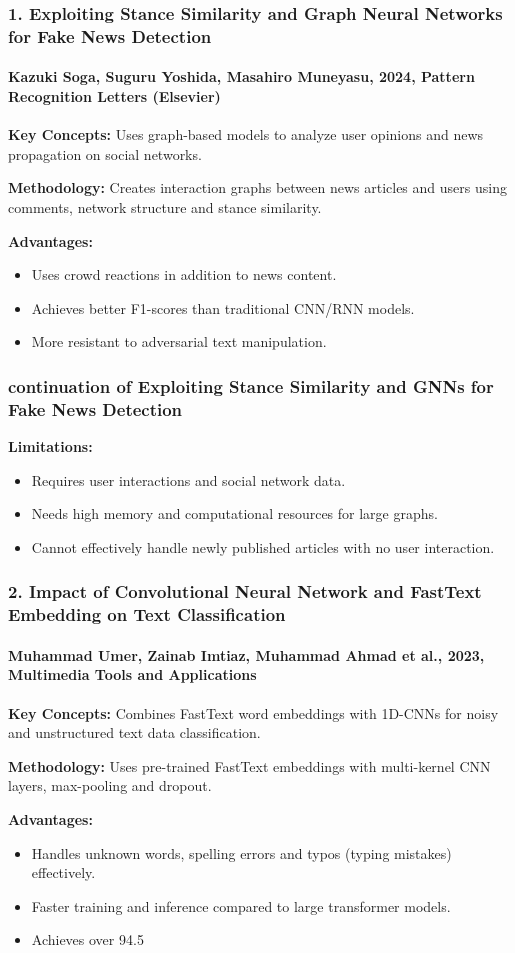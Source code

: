 \documentclass{beamer}
\begin{document}
\begin{frame}
\frametitle{1. Exploiting Stance Similarity and Graph Neural Networks for Fake News Detection}
\framesubtitle{Kazuki Soga, Suguru Yoshida, Masahiro Muneyasu, 2024, Pattern Recognition Letters (Elsevier)}
\small{
\textbf{Key Concepts:} Uses graph-based models to analyze user opinions and news propagation on social networks. \par\vspace{0.15cm}
\textbf{Methodology:} Creates interaction graphs between news articles and users using comments, network structure and stance similarity. \par\vspace{0.15cm}
\textbf{Advantages:}
\begin{itemize}
    \item Uses crowd reactions in addition to news content.
    \item Achieves better F1-scores than traditional CNN/RNN models.
    \item More resistant to adversarial text manipulation.
\end{itemize}
}
\end{frame}

\begin{frame}
\frametitle{continuation of Exploiting Stance Similarity and GNNs for Fake News Detection}
\large{
\textbf{Limitations:}
\begin{itemize}
    \item Requires user interactions and social network data.
    \item Needs high memory and computational resources for large graphs.
    \item Cannot effectively handle newly published articles with no user interaction.
\end{itemize}
}
\end{frame}

\begin{frame}
\frametitle{2. Impact of Convolutional Neural Network and FastText Embedding on Text Classification}
\framesubtitle{Muhammad Umer, Zainab Imtiaz, Muhammad Ahmad et al., 2023, Multimedia Tools and Applications}
\small{
\textbf{Key Concepts:} Combines FastText word embeddings with 1D-CNNs for noisy and unstructured text data classification. \par\vspace{0.15cm}
\textbf{Methodology:} Uses pre-trained FastText embeddings with multi-kernel CNN layers, max-pooling and dropout. \par\vspace{0.15cm}
\textbf{Advantages:}
\begin{itemize}
    \item Handles unknown words, spelling errors and typos (typing mistakes) effectively.
    \item Faster training and inference compared to large transformer models.
    \item Achieves over 94.5%
\end{itemize}
}
\end{frame}
\end{document}
